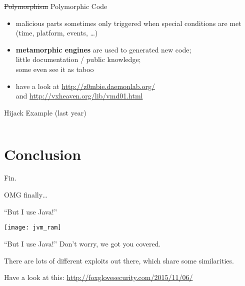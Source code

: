 \documentclass[beamer]{uibk}
\begin{document}
\begin{frame}{\st{Polymorphism} Polymorphic Code}
    \begin{itemize}
        \item malicious parts sometimes only triggered when special conditions
            are met (time, platform, events, \dots)
        \medskip
        \pause
        \item \textbf{metamorphic engines} are used to generated new code;\\
            little documentation / public knowledge;\\
            some even see it as taboo
        \medskip
        \pause
        \item have a look at \url{http://z0mbie.daemonlab.org/}\\
            and \url{http://vxheaven.org/lib/vmd01.html}
    \end{itemize}
\end{frame}

\begin{frame}[t,fragile]{Hijack Example (last year)}
    \begin{columns}
        \begin{column}{0.75\textwidth}
        \end{column}
        \begin{column}{0.25\textwidth}
        \end{column}
    \end{columns}
\end{frame}

\section*{Conclusion}

\begin{frame}{Fin.}
   \begin{center}
       \huge OMG finally\dots
   \end{center}
\end{frame}

\begin{frame}{``But I use Java!''}
    \begin{center}
        \texttt{[image: jvm\_ram]}
    \end{center}
\end{frame}

\begin{frame}{``But I use Java!''}
    Don't worry, we got you covered.

    \bigskip

    There are lots of different exploits out there, which share some
    similarities.

    \bigskip

    Have a look at this: \url{http://foxglovesecurity.com/2015/11/06/}
\end{frame}
\end{document}
